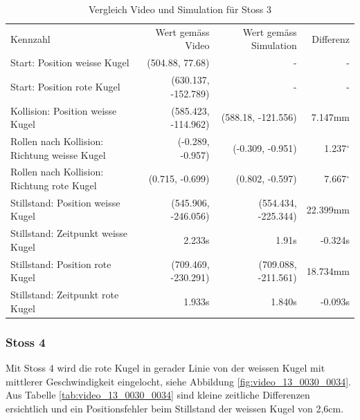 \begin{table}[ht]
    \begin{tabular}{ lrrr }
        \rowcolor{\seccolor!50}
        Kennzahl & Wert gemäss Video & Wert gemäss Simulation & Differenz \\
        Start: Position weisse Kugel & (504.88, 77.68) & - & -\\
        Start: Position rote Kugel & (630.137, -152.789) & - & -\\
        Kollision: Position weisse Kugel & (585.423, -114.962) & (588.18, -121.556) & 7.147mm\\
        Rollen nach Kollision: Richtung weisse Kugel & (-0.289, -0.957) & (-0.309, -0.951) & 1.237$^{\circ}$ \\
        Rollen nach Kollision: Richtung rote Kugel & (0.715, -0.699) & (0.802, -0.597) & 7.667$^{\circ}$ \\
        Stillstand: Position weisse Kugel & (545.906, -246.056) & (554.434, -225.344) & 22.399mm\\
        Stillstand: Zeitpunkt weisse Kugel & 2.233s & 1.91s & -0.324s\\
        Stillstand: Position rote Kugel & (709.469, -230.291) & (709.088, -211.561) & 18.734mm\\
        Stillstand: Zeitpunkt rote Kugel & 1.933s & 1.840s & -0.093s\\
    \end{tabular}
    \caption{Vergleich Video und Simulation für Stoss 3}
    \label{tab:video_12_0205_0208}
\end{table}

\newpage
\subsubsection{Stoss 4}
Mit Stoss 4 wird die rote Kugel in gerader Linie von der weissen Kugel mit mittlerer Geschwindigkeit eingelocht,
siehe Abbildung \ref{fig:video_13_0030_0034}.
Aus Tabelle \ref{tab:video_13_0030_0034} sind kleine zeitliche Differenzen ersichtlich und
ein Positionsfehler beim Stillstand der weissen Kugel von 2,6cm.

